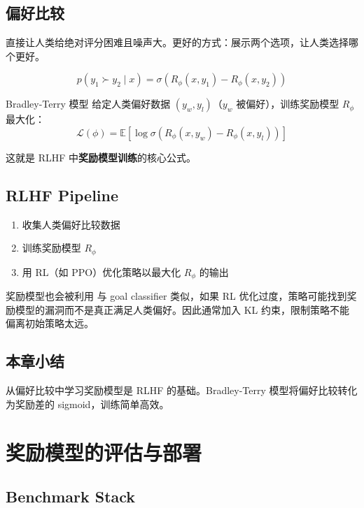 \documentclass[a4paper]{article}
\begin{document}
\subsection{偏好比较}

直接让人类给绝对评分困难且噪声大。更好的方式：展示两个选项，让人类选择哪个更好。

$$p(y_1 \succ y_2 \mid x) = \sigma\left(R_\phi(x, y_1) - R_\phi(x, y_2)\right)$$

\begin{importantbox}{Bradley-Terry 模型}
给定人类偏好数据 $(y_w, y_l)$（$y_w$ 被偏好），训练奖励模型 $R_\phi$ 最大化：
$$\mathcal{L}(\phi) = \mathbb{E}\left[\log \sigma\left(R_\phi(x, y_w) - R_\phi(x, y_l)\right)\right]$$

这就是 RLHF 中\textbf{奖励模型训练}的核心公式。
\end{importantbox}

\subsection{RLHF Pipeline}

\begin{enumerate}
    \item 收集人类偏好比较数据
    \item 训练奖励模型 $R_\phi$
    \item 用 RL（如 PPO）优化策略以最大化 $R_\phi$ 的输出
\end{enumerate}

\begin{warningbox}{奖励模型也会被利用}
与 goal classifier 类似，如果 RL 优化过度，策略可能找到奖励模型的漏洞而不是真正满足人类偏好。因此通常加入 KL 约束，限制策略不能偏离初始策略太远。
\end{warningbox}

\subsection{本章小结}

从偏好比较中学习奖励模型是 RLHF 的基础。Bradley-Terry 模型将偏好比较转化为奖励差的 sigmoid，训练简单高效。

\section{奖励模型的评估与部署}

\subsection{Benchmark Stack}
\end{document}
